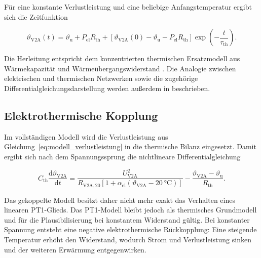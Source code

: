 Für eine konstante Verlustleistung und eine beliebige Anfangstemperatur ergibt
sich die Zeitfunktion

\begin{equation}
    \vartheta_{\mathrm{V2A}}(t)
    =
    \vartheta_{\mathrm{u}}
    +P_{\mathrm{el}}R_{\mathrm{th}}
    +
    \left[
        \vartheta_{\mathrm{V2A}}(0)
        -\vartheta_{\mathrm{u}}
        -P_{\mathrm{el}}R_{\mathrm{th}}
    \right]
    \exp\!\left(-\frac{t}{\tau_{\mathrm{th}}}\right).
    \label{eq:modell_pt1_zeitfunktion}
\end{equation}

Die Herleitung entspricht dem konzentrierten thermischen Ersatzmodell aus
Wärmekapazität und Wärmeübergangswiderstand
\parencite[S.~30--33]{Griesinger_Waermemanagement}. Die Analogie zwischen
elektrischen und thermischen Netzwerken sowie die zugehörige
Differentialgleichungsdarstellung werden außerdem in
\textcite[S.~226--229]{Griesinger_Waermemanagement} beschrieben.


\subsection{Elektrothermische Kopplung}
\label{sec:elektrothermische_kopplung}

Im vollständigen Modell wird die Verlustleistung aus
Gleichung~\eqref{eq:modell_verlustleistung} in die thermische Bilanz eingesetzt.
Damit ergibt sich nach dem Spannungssprung die nichtlineare
Differentialgleichung

\begin{equation}
    C_{\mathrm{th}}
    \frac{\mathrm{d}\vartheta_{\mathrm{V2A}}}{\mathrm{d}t}
    =
    \frac{U_{\mathrm{V2A}}^{2}}
    {R_{\mathrm{V2A},20}
        \left[
            1+\alpha_{\mathrm{el}}
            \left(\vartheta_{\mathrm{V2A}}
                  -\SI{20}{\degreeCelsius}\right)
        \right]}
    -
    \frac{\vartheta_{\mathrm{V2A}}-\vartheta_{\mathrm{u}}}
         {R_{\mathrm{th}}}.
    \label{eq:modell_elektrothermische_dgl}
\end{equation}

Das gekoppelte Modell besitzt daher nicht mehr exakt das Verhalten eines
linearen PT1-Glieds. Das PT1-Modell bleibt jedoch als thermisches Grundmodell
und für die Plausibilisierung bei konstantem Widerstand gültig. Bei konstanter
Spannung entsteht eine negative elektrothermische Rückkopplung: Eine steigende
Temperatur erhöht den Widerstand, wodurch Strom und Verlustleistung sinken und
der weiteren Erwärmung entgegenwirken.

